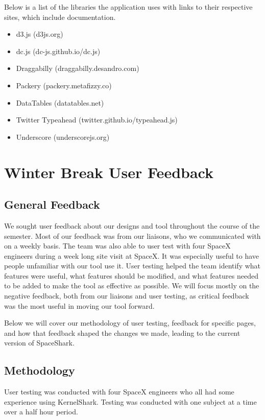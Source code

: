 \documentclass{hmcclinic}
\begin{document}
  Below is a list of the libraries the application uses with links to
  their respective sites, which include documentation.
\begin{itemize}
\item d3.js (d3js.org)
\item dc.js (dc-js.github.io/dc.js)
\item Draggabilly (draggabilly.desandro.com)
\item Packery (packery.metafizzy.co)
\item DataTables (datatables.net)
\item Twitter Typeahead (twitter.github.io/typeahead.js)
\item Underscore (underscorejs.org)
\end{itemize}


\chapter{Winter Break User Feedback} %
\section{General Feedback} %
We sought user feedback about our designs and tool throughout the course of the
semester. Most of our feedback was from our liaisons, who we communicated with
on a weekly basis. The team was also able to user test with four SpaceX
engineers during a week long site visit at SpaceX. It was especially useful to
have people unfamiliar with our tool use it.  User testing helped the team
identify what features were useful, what features should be modified, and what
features needed to be added to make the tool as effective as possible.  We will
focus mostly on the negative feedback, both from our liaisons and user testing,
as critical feedback was the most useful in moving our tool forward.

Below we will cover our methodology of user testing, feedback for specific
pages, and how that feedback shaped the changes we made, leading to the current
version of SpaceShark.

\section{Methodology} %
User testing was conducted with four SpaceX engineers who all had some
experience using KernelShark. Testing was conducted with one subject
at a time over a half hour period.
\end{document}
